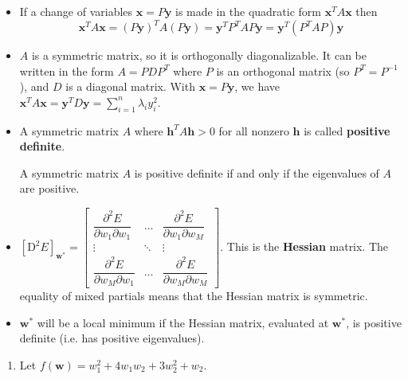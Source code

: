 \documentclass[12pt,letterpaper,noanswers]{exam}
\newcommand{\vc}[1]{\boldsymbol{#1}}
\begin{document}
\begin{tcolorbox}
    \begin{itemize}
    \item If a change of variables $\vc{x} = P\vc{y}$ is made in the quadratic form $\vc{x}^TA\vc{x}$ then
    \[\vc{x}^TA\vc{x} = (P\vc{y})^TA(P\vc{y}) = \vc{y}^TP^TAP\vc{y} = \vc{y}^T(P^TAP)\vc{y}\]
    \item $A$ is a symmetric matrix, so it is orthogonally diagonalizable.  It can be written in the form $A = PDP^T$ where $P$ is an orthogonal matrix (so $P^T=P^{-1}$), and $D$ is a diagonal matrix.  With $\vc{x} = P\vc{y}$, we have $\vc{x}^T A \vc{x} = \vc{y}^T D \vc{y} = \sum\limits_{i=1}^n \lambda_i y_i^2$.
    
    \item A symmetric matrix $A$ where $\vc{h}^TA\vc{h}>0$ for all nonzero $\vc{h}$ is called \textbf{positive definite}.
    
    A symmetric matrix $A$ is positive definite if and only if the eigenvalues of $A$ are positive.
 
    
    \item $\left[\text{D}^2E\right]_{\vc{w}^*} = \left[\begin{array}{ccc}
    \dfrac{\partial^2E}{\partial w_1 \partial w_1} & \hdots & \dfrac{\partial^2E}{\partial w_1 \partial w_M} \\
    \vdots & \ddots & \vdots \\
    
    \dfrac{\partial^2E}{\partial w_M \partial w_1} & \hdots & \dfrac{\partial^2E}{\partial w_M \partial w_M}
    \end{array}\right]$. This is the \textbf{Hessian} matrix.  The equality of mixed partials means that the Hessian matrix is symmetric.
    \item $\vc{w}^*$ will be a local minimum if the Hessian matrix, evaluated at $\vc{w}^*$, is positive definite (i.e. has positive eigenvalues).
\end{itemize}
\end{tcolorbox}
\begin{enumerate}[resume=classQ]
\item Let $f(\vc{w}) = w_1^2+4w_1w_2+3w_2^2+w_2$.  
 
 \vspace{1.2cm}




\end{enumerate}
\end{document}
